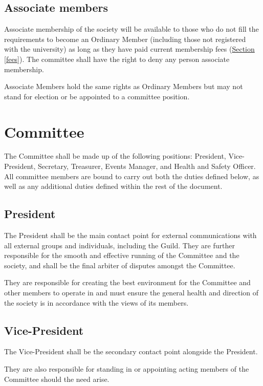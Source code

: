 \documentclass{report}
\newcommand{\sref}[1]{\hyperref[#1]{Section \ref*{#1}}}
\begin{document}
	\subsection{Associate members}
	\label{member_associate}
	
	Associate membership of the society will be available to those who do not fill the requirements to become an Ordinary Member (including those not registered with the university) as long as they have paid current membership fees (\sref{fees}). The committee shall have the right to deny any person associate membership.
	
	Associate Members hold the same rights as Ordinary Members but may not stand for election or be appointed to a committee position.
	
\newpage
\section{Committee}
\label{committee}

The Committee shall be made up of the following positions: President, Vice-President, Secretary, Treasurer, Events Manager, and Health and Safety Officer. All committee members are bound to carry out both the duties defined below, as well as any additional duties defined within the rest of the document.

	\subsection{President}

	The President shall be the main contact point for external communications with all external groups and individuals, including the Guild. They are further responsible for the smooth and effective running of the Committee and the society, and shall be the final arbiter of disputes amongst the Committee.
	
	They are responsible for creating the best environment for the Committee and other members to operate in and must ensure the general health and direction of the society is in accordance with the views of its members.
	
	\subsection{Vice-President}
	
	The Vice-President shall be the secondary contact point alongside the President.
	
	They are also responsible for standing in or appointing acting members of the Committee should the need arise.
	
\end{document}

